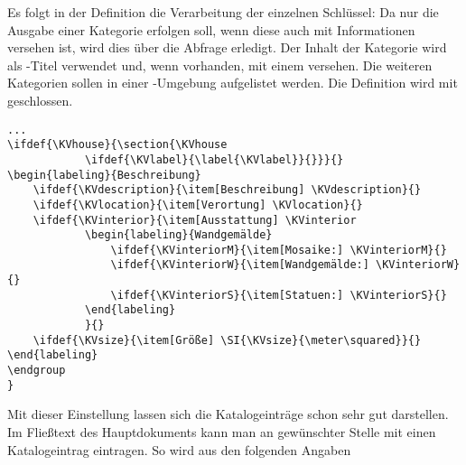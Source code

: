 \documentclass[ngerman]{dtk}
\begin{document}
Es folgt in der Definition die Verarbeitung der einzelnen Schlüssel:
Da nur die Ausgabe einer Kategorie erfolgen soll,
wenn diese auch mit Informationen versehen ist,
wird dies über die Abfrage  erledigt.
Der Inhalt der Kategorie  wird als -Titel verwendet und, wenn vorhanden, mit einem  versehen.
Die weiteren Kategorien sollen in einer -Umgebung aufgelistet werden.
Die Definition wird mit  geschlossen.
\begin{lstlisting}[style=number]
...
\ifdef{\KVhouse}{\section{\KVhouse
			\ifdef{\KVlabel}{\label{\KVlabel}}{}}}{}
\begin{labeling}{Beschreibung}
	\ifdef{\KVdescription}{\item[Beschreibung] \KVdescription}{}
	\ifdef{\KVlocation}{\item[Verortung] \KVlocation}{}
	\ifdef{\KVinterior}{\item[Ausstattung] \KVinterior
			\begin{labeling}{Wandgemälde}
				\ifdef{\KVinteriorM}{\item[Mosaike:] \KVinteriorM}{}
				\ifdef{\KVinteriorW}{\item[Wandgemälde:] \KVinteriorW}{}
				\ifdef{\KVinteriorS}{\item[Statuen:] \KVinteriorS}{}
			\end{labeling}
			}{}
	\ifdef{\KVsize}{\item[Größe] \SI{\KVsize}{\meter\squared}}{}
\end{labeling}
\endgroup
}
\end{lstlisting}

Mit dieser Einstellung lassen sich die Katalogeinträge schon sehr gut darstellen.
Im Fließtext des Hauptdokuments kann man an gewünschter Stelle mit  einen Katalogeintrag eintragen.
So wird aus den folgenden Angaben 
\end{document}
